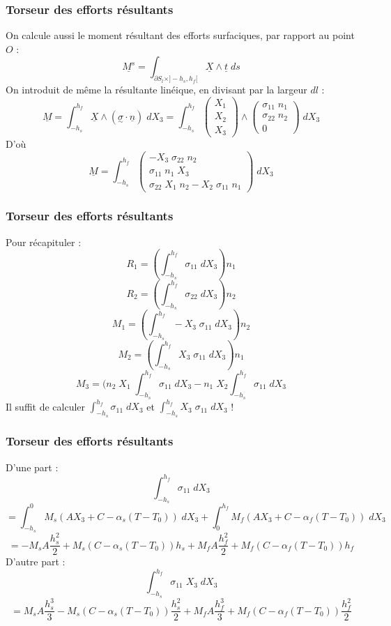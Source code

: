 \begin{frame}
    \frametitle{Torseur des efforts résultants}
    On calcule aussi le moment résultant des efforts surfaciques, par rapport au point $O$ :
    $$\underline{M^{s}} = \int_{\partial S_l \times ]-h_s,h_f[}\underline{X}\wedge \underline{t}\;ds$$
    On introduit de même la résultante linéique, en divisant par la largeur $dl$ :
    $$\underline{M} = \int_{-h_s}^{h_f}\underline{X}\wedge (\underset{\sim}{\sigma}\cdot\underline{n})\;dX_3 = \int_{-h_s}^{h_f}\begin{pmatrix} X_1 \\ X_2 \\ X_3 \end{pmatrix}\wedge \begin{pmatrix} \sigma_{11}\;n_1 \\ \sigma_{22}\;n_2 \\ 0 \end{pmatrix}\;dX_3$$
    D'où $$\underline{M} = \int_{-h_s}^{h_f}\begin{pmatrix} -X_3\;\sigma_{22}\;n_2 \\ \sigma_{11}\;n_1\;X_3 \\ \sigma_{22}\;X_1\;n_2 - X_2\;\sigma_{11}\;n_1 \end{pmatrix}\;dX_3$$
\end{frame}

\begin{frame}
    \frametitle{Torseur des efforts résultants}
    Pour récapituler :
    $$R_1 = (\int_{-h_s}^{h_f}\sigma_{11}\;dX_3)n_1$$
    $$R_2 = (\int_{-h_s}^{h_f}\sigma_{22}\;dX_3)n_2$$
    $$M_1 = (\int_{-h_s}^{h_f} -X_3\;\sigma_{11}\;dX_3)n_2$$
    $$M_2 = (\int_{-h_s}^{h_f} X_3\;\sigma_{11}\;dX_3)n_1$$
    $$M_3 = (n_2\;X_1\;\int_{-h_s}^{h_f} \sigma_{11}\;dX_3 - n_1\;X_2 \int_{-h_s}^{h_f} \sigma_{11}\;dX_3$$
    Il suffit de calculer $\int_{-h_s}^{h_f}\sigma_{11}\;dX_3$ et $\int_{-h_s}^{h_f}X_3\;\sigma_{11}\;dX_3$ !
\end{frame}

\begin{frame}
    \frametitle{Torseur des efforts résultants}
    D'une part :
    $$\int_{-h_s}^{h_f}\sigma_{11}\;dX_3$$ $$=\int_{-h_s}^{0}M_s(AX_3+C-\alpha_s(T-T_0))\;dX_3+\int_{0}^{h_f}M_f(AX_3+C-\alpha_f(T-T_0))\;dX_3$$
    $$=-M_sA\frac{h_s^{2}}{2}+M_s(C-\alpha_s(T-T_0))h_s+M_fA\frac{h_f^{2}}{2}+M_f(C-\alpha_f(T-T_0))h_f$$
    D'autre part :
    $$\int_{-h_s}^{h_f}\sigma_{11}\;X_3\;dX_3$$
    $$=M_sA\frac{h_s^{3}}{3}-M_s(C-\alpha_s(T-T_0))\frac{h_s^{2}}{2}+M_fA\frac{h_f^{3}}{3}+M_f(C-\alpha_f(T-T_0))\frac{h_f^{2}}{2}$$
\end{frame}

